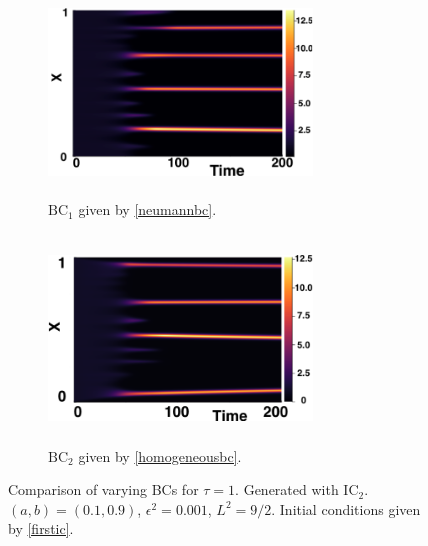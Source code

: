 \begin{figure}[H]
    \centering
    \begin{subfigure}[b]{0.45\textwidth}
        \centering
        \includegraphics[width=7cm,height=5.5cm]{ic21.png}
        \caption{$\text{BC}_1$ given by \eqref{neumannbc}.}
        \label{}
    \end{subfigure}
    \hfill
    \begin{subfigure}[b]{0.45\textwidth}
        \centering
        \includegraphics[width=7cm,height=5.5cm]{bc1.png}
        \caption{$\text{BC}_2$ given by \eqref{homogeneousbc}.}
        \label{}
    \end{subfigure}
    \caption{Comparison of varying BCs for $\tau=1$. Generated with $\text{IC}_2$. $(a,b)=(0.1,0.9)$, $\epsilon^2=0.001$, $L^2=9/2$. Initial conditions given by \eqref{firstic}.}
    \label{fig:bctau2}
\end{figure}

